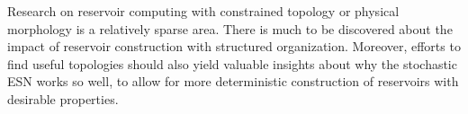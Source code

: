 Research on reservoir computing with constrained topology or physical morphology
is a relatively sparse area. There is much to be discovered about the impact of
reservoir construction with structured organization. Moreover, efforts to find
useful topologies should also yield valuable insights about why the stochastic
ESN works so well, to allow for more deterministic construction of reservoirs
with desirable properties.

